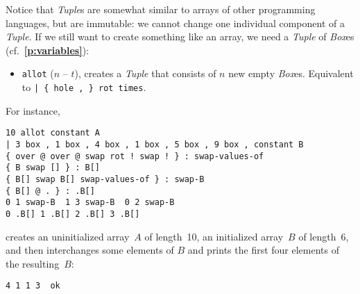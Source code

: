 \documentclass[12pt,oneside]{article}
\def\refpoint#1{{\rm\textbf{\ref{#1}}}}
\let\ptref=\refpoint
\begin{document}
Notice that {\em Tuple\/}s are somewhat similar to arrays of other programming languages, but are immutable: we cannot change one individual component of a {\em Tuple}. If we still want to create something like an array, we need a {\em Tuple\/} of {\em Box\/}es (cf.~\ptref{p:variables}):
\begin{itemize}
\item {\tt allot} ($n$ -- $t$), creates a {\em Tuple\/} that consists of $n$ new empty {\em Box\/}es. Equivalent to {\tt | \{ hole , \} rot times}.
\end{itemize}
For instance,
\begin{verbatim}
10 allot constant A
| 3 box , 1 box , 4 box , 1 box , 5 box , 9 box , constant B
{ over @ over @ swap rot ! swap ! } : swap-values-of
{ B swap [] } : B[]
{ B[] swap B[] swap-values-of } : swap-B
{ B[] @ . } : .B[] 
0 1 swap-B  1 3 swap-B  0 2 swap-B
0 .B[] 1 .B[] 2 .B[] 3 .B[]
\end{verbatim}
creates an uninitialized array~$A$ of length~10, an initialized array~$B$ of length~6, and then interchanges some elements of $B$ and prints the first four elements of the resulting~$B$:
\begin{verbatim}
4 1 1 3  ok
\end{verbatim}
\end{document}
